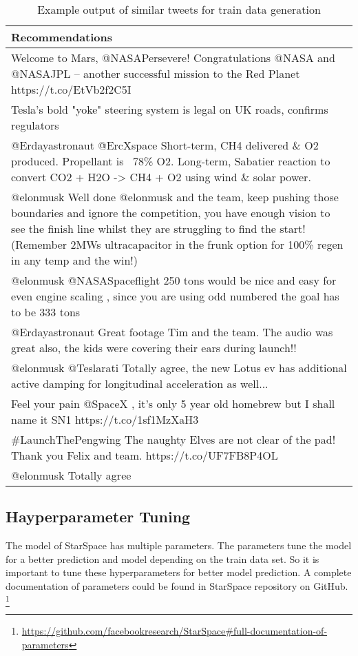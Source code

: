 \begin{table}[!h]
	\centering
	\caption{Example output of similar tweets for train data generation}
	\label{tab:example-train-data}
	\begin{tabular}{|m{}|}
		\hline
		\textbf{Recommendations} \\
		\hline
		Welcome to Mars, @NASAPersevere! Congratulations @NASA and @NASAJPL – another successful mission to the Red Planet https://t.co/EtVb2f2C5I \\
		\hline
		Tesla’s bold "yoke" steering system is legal on UK roads, confirms regulators \\
		\hline
		@Erdayastronaut @ErcXspace Short-term, CH4 delivered \& O2 produced. Propellant is ~78\% O2. Long-term, Sabatier reaction to convert CO2 + H2O -> CH4 + O2 using wind \& solar power. \\
		\hline
		@elonmusk Well done @elonmusk and the team, keep pushing those boundaries and ignore the competition,  you have enough vision to see the finish line whilst they are struggling to find the start! (Remember 2MWs ultracapacitor in the frunk option for 100\% regen in any temp and the win!) \\
		\hline
		@elonmusk @NASASpaceflight 250 tons would be nice and easy for even engine scaling , since you are using odd numbered the goal has to be 333 tons \\
		\hline
		@Erdayastronaut Great footage Tim and the team. The audio was great also,  the kids were covering their ears during launch!! \\
		\hline
		@elonmusk @Teslarati Totally agree, the new Lotus ev has additional active damping for longitudinal acceleration as well... \\
		\hline
		Feel your pain @SpaceX , it's only 5 year old homebrew but I shall name it SN1 https://t.co/1sf1MzXaH3 \\
		\hline
		\#LaunchThePengwing The naughty Elves are not clear of the pad! Thank you Felix and team. https://t.co/UF7FB8P4OL \\
		\hline
		@elonmusk Totally agree \\
		\hline
	\end{tabular}
\end{table}



\subsection{Hayperparameter Tuning}
\label{subsec:hyperparameter-tuning}
The model of StarSpace has multiple parameters. The parameters tune the model for a better prediction and model depending on the train data set. So it is important to tune these hyperparameters for better model prediction. A complete documentation of parameters could be found in StarSpace repository on GitHub. \footnote{\url{https://github.com/facebookresearch/StarSpace\#full-documentation-of-parameters}}

